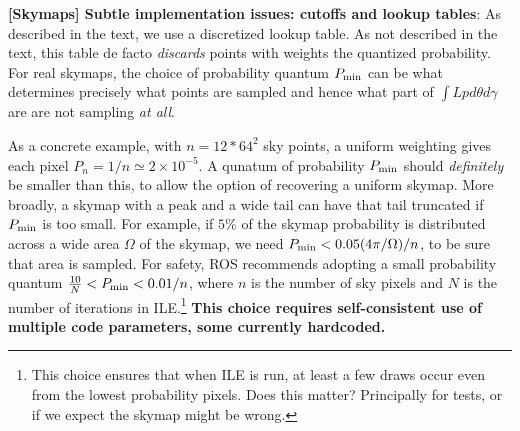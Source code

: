 
\noindent \textbf{[Skymaps] Subtle implementation issues: cutoffs and lookup tables}: As described in the text, we use a
discretized lookup table.  As not described in the text, this table de facto \emph{discards} points with weights the
quantized probability.   For real skymaps, the choice of probability quantum $P_{\rm min}$ can be what determines
precisely what points are sampled and hence what part of $\int L p d\theta d\gamma$ are are not sampling \emph{at all}.

As a concrete example, with $n=12*64^2$ sky points, a uniform weighting gives each pixel $P_{n}
=1/n \simeq 2\times 10^{-5}$.  A qunatum of probability $P_{\rm min} $ should \emph{definitely} be smaller than this, to
allow the option of recovering a uniform skymap.
%
More broadly, a skymap with a peak and a wide tail can have that tail truncated if $P_{\rm min}$ is too small.  For
example, if $5\%$ of the skymap probability is distributed across a wide area $\Omega$ of the skymap, we need $P_{\rm
  min} < 0.05 (4\pi/\Omega)/n$, to be sure that area is sampled.  
%
For safety, ROS recommends adopting a small probability quantum $\frac{10}{N}<P_{\rm min} < 0.01/n$, where $n$ is the
number of sky pixels and $N$ is the number of iterations in ILE.\footnote{This choice ensures that when ILE is run, at
  least a few draws occur even from the lowest probability pixels.  Does this matter?  Principally for tests, or if
we expect the \BS{} skymap might be wrong.}  \textbf{This choice requires self-consistent use of
  multiple code parameters, some currently hardcoded. }

